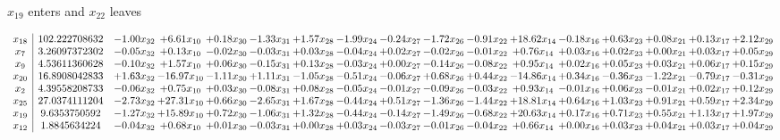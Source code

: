 \documentclass[9pt]{article}
\begin{document}
 $ x_{19} $ enters and $ x_{22} $ leaves 

 \[\begin{array}{c| c c@{\hskip 2pt} c@{\hskip 2pt} c@{\hskip 2pt} c@{\hskip 2pt} c@{\hskip 2pt} c@{\hskip 2pt} c@{\hskip 2pt} c@{\hskip 2pt} c@{\hskip 2pt} c@{\hskip 2pt} c@{\hskip 2pt} c@{\hskip 2pt} c@{\hskip 2pt} c@{\hskip 2pt} c@{\hskip 2pt} }
 x_{18}   &  102.222708632 & -1.00 x_{32} & +  6.61 x_{10} & +  0.18 x_{30} & -1.33 x_{31} & +  1.57 x_{28} & -1.99 x_{24} & -0.24 x_{27} & -1.72 x_{26} & -0.91 x_{22} & + 18.62 x_{14} & -0.18 x_{16} & +  0.63 x_{23} & +  0.08 x_{21} & +  0.13 x_{17} & +  2.12 x_{29}\\
 x_{7}   &  3.26097372302 & -0.05 x_{32} & +  0.13 x_{10} & -0.02 x_{30} & -0.03 x_{31} & +  0.03 x_{28} & -0.04 x_{24} & +  0.02 x_{27} & -0.02 x_{26} & -0.01 x_{22} & +  0.76 x_{14} & +  0.03 x_{16} & +  0.02 x_{23} & +  0.00 x_{21} & +  0.03 x_{17} & +  0.05 x_{29}\\
 x_{9}   &  4.53611360628 & -0.10 x_{32} & +  1.57 x_{10} & +  0.06 x_{30} & -0.15 x_{31} & +  0.13 x_{28} & -0.03 x_{24} & +  0.00 x_{27} & -0.14 x_{26} & -0.08 x_{22} & +  0.95 x_{14} & +  0.02 x_{16} & +  0.05 x_{23} & +  0.03 x_{21} & +  0.06 x_{17} & +  0.15 x_{29}\\
 x_{20}   &  16.8908042833 & +  1.63 x_{32} & -16.97 x_{10} & -1.11 x_{30} & +  1.11 x_{31} & -1.05 x_{28} & -0.51 x_{24} & -0.06 x_{27} & +  0.68 x_{26} & +  0.44 x_{22} & -14.86 x_{14} & +  0.34 x_{16} & -0.36 x_{23} & -1.22 x_{21} & -0.79 x_{17} & -0.31 x_{29}\\
 x_{2}   &  4.39558208733 & -0.06 x_{32} & +  0.75 x_{10} & +  0.03 x_{30} & -0.08 x_{31} & +  0.08 x_{28} & -0.05 x_{24} & -0.01 x_{27} & -0.09 x_{26} & -0.03 x_{22} & +  0.93 x_{14} & -0.01 x_{16} & +  0.06 x_{23} & -0.01 x_{21} & +  0.02 x_{17} & +  0.12 x_{29}\\
 x_{25}   &  27.0374111204 & -2.73 x_{32} & + 27.31 x_{10} & +  0.66 x_{30} & -2.65 x_{31} & +  1.67 x_{28} & -0.44 x_{24} & +  0.51 x_{27} & -1.36 x_{26} & -1.44 x_{22} & + 18.81 x_{14} & +  0.64 x_{16} & +  1.03 x_{23} & +  0.91 x_{21} & +  0.59 x_{17} & +  2.34 x_{29}\\
 x_{19}   &  9.6353750592 & -1.27 x_{32} & + 15.89 x_{10} & +  0.72 x_{30} & -1.06 x_{31} & +  1.32 x_{28} & -0.44 x_{24} & -0.14 x_{27} & -1.49 x_{26} & -0.68 x_{22} & + 20.63 x_{14} & +  0.17 x_{16} & +  0.71 x_{23} & +  0.55 x_{21} & +  1.13 x_{17} & +  1.97 x_{29}\\
 x_{12}   &  1.8845634224 & -0.04 x_{32} & +  0.68 x_{10} & +  0.01 x_{30} & -0.03 x_{31} & +  0.00 x_{28} & +  0.03 x_{24} & -0.03 x_{27} & -0.01 x_{26} & -0.04 x_{22} & +  0.66 x_{14} & +  0.00 x_{16} & +  0.03 x_{23} & +  0.04 x_{21} & +  0.03 x_{17} & +  0.04 x_{29}\\

\end{array}\]
\end{document}

